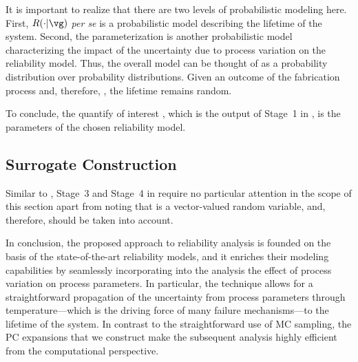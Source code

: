 \begin{remark} 
It is important to realize that there are two levels of probabilistic modeling
here. First, $R(\cdot | \vg)$ \emph{per se} is a probabilistic model describing
the lifetime of the system. Second, the parameterization \vg is another
probabilistic model characterizing the impact of the uncertainty due to process
variation on the reliability model. Thus, the overall model can be thought of as
a probability distribution over probability distributions. Given an outcome of
the fabrication process and, therefore, \vg, the lifetime remains random.
\end{remark}

To conclude, the quantify of interest \g, which is the output of Stage~1 in
, is the parameters \vg of the chosen reliability model.

\subsection{Surrogate Construction}

Similar to , Stage~3 and Stage~4 in
 require no particular attention in the scope of this
section apart from noting that \vg is a vector-valued random variable, and,
therefore,  should be taken into account.

In conclusion, the proposed approach to reliability analysis is founded on the
basis of the state-of-the-art reliability models, and it enriches their modeling
capabilities by seamlessly incorporating into the analysis the effect of process
variation on process parameters. In particular, the technique allows for a
straightforward propagation of the uncertainty from process parameters through
temperature---which is the driving force of many failure mechanisms---to the
lifetime of the system. In contrast to the straightforward use of \ac{MC}
sampling, the \ac{PC} expansions that we construct make the subsequent analysis
highly efficient from the computational perspective.
